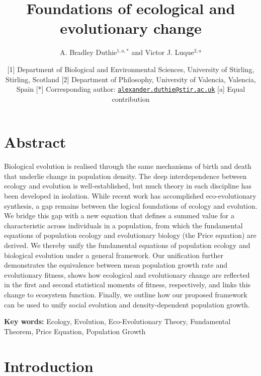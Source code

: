 \documentclass[
]{article}
\title{Foundations of ecological and evolutionary change}
\author{A. Bradley Duthie\(^{1,a,*}\) and Victor J. Luque\(^{2,a}\)}
\date{{[}1{]} Department of Biological and Environmental Sciences,
University of Stirling, Stirling, Scotland {[}2{]} Department of
Philosophy, University of Valencia, Valencia, Spain {[}*{]}
Corresponding author:
\href{mailto:alexander.duthie@stir.ac.uk}{\nolinkurl{alexander.duthie@stir.ac.uk}}
{[}a{]} Equal contribution}
\begin{document}
\maketitle

\section{Abstract}\label{abstract}

Biological evolution is realised through the same mechanisms of birth
and death that underlie change in population density. The deep
interdependence between ecology and evolution is well-established, but
much theory in each discipline has been developed in isolation. While
recent work has accomplished eco-evolutionary synthesis, a gap remains
between the logical foundations of ecology and evolution. We bridge this
gap with a new equation that defines a summed value for a characteristic
across individuals in a population, from which the fundamental equations
of population ecology and evolutionary biology (the Price equation) are
derived. We thereby unify the fundamental equations of population
ecology and biological evolution under a general framework. Our
unification further demonstrates the equivalence between mean population
growth rate and evolutionary fitness, shows how ecological and
evolutionary change are reflected in the first and second statistical
moments of fitness, respectively, and links this change to ecosystem
function. Finally, we outline how our proposed framework can be used to
unify social evolution and density-dependent population growth.

\textbf{Key words:} Ecology, Evolution, Eco-Evolutionary Theory,
Fundamental Theorem, Price Equation, Population Growth

\section{Introduction}\label{introduction}
\end{document}
